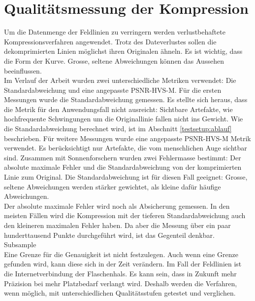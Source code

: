 \section{Qualitätsmessung der Kompression}
Um die Datenmenge der Feldlinien zu verringern werden verlustbehaftete Kompressionsverfahren angewendet. Trotz des Dateverlustes sollen die dekomprimierten Linien möglichst ihren Originalen ähneln. Es ist wichtig, dass die Form der Kurve. Grosse, seltene Abweichungen können das Aussehen beeinflussen.\\
[\baselineskip]
Im Verlauf der Arbeit wurden zwei unterschiedliche Metriken verwendet: Die Standardabweichung und eine angepasste PSNR-HVS-M. Für die ersten Messungen wurde die Standardabweichung gemessen. Es stellte sich heraus, dass die Metrik für den Anwendungsfall nicht ausreicht: Sichtbare Artefakte, wie hochfrequente Schwingungen um die Originallinie fallen nicht ins Gewicht. Wie die Standardabweichung berechnet wird, ist im Abschnitt \ref{testsetup:ablauf} beschrieben. Für weitere Messungen wurde eine angepasste PSNR-HVS-M Metrik verwendet. Es berücksichtigt nur Artefakte, die vom menschlichen Auge sichtbar sind.
Zusammen mit Sonnenforschern wurden zwei Fehlermasse bestimmt: Der absolute maximale Fehler und die Standardabweichung von der komprimierten Linie zum Original. Die Standardabweichung ist für diesen Fall geeignet: Grosse, seltene Abweichungen werden stärker gewichtet, als kleine dafür häufige Abweichungen.\\
Der absolute maximale Fehler wird noch als Absicherung gemessen. In den meisten Fällen wird die Kompression mit der tieferen Standardabweichung auch den kleineren maximalen Fehler haben. Da aber die Messung über ein paar hunderttausend Punkte durchgeführt wird, ist das Gegenteil denkbar.\\
Subsample\\
[\baselineskip]
Eine Grenze für die Genauigkeit ist nicht festzulegen. Auch wenn eine Grenze gefunden wird, kann diese sich in der Zeit verändern. Im Fall der Feldlinien ist die Internetverbindung der Flaschenhals. Es kann sein, dass in Zukunft mehr Präzision bei mehr Platzbedarf verlangt wird. Deshalb werden die Verfahren, wenn möglich, mit unterschiedlichen Qualitätsstufen getestet und verglichen.

